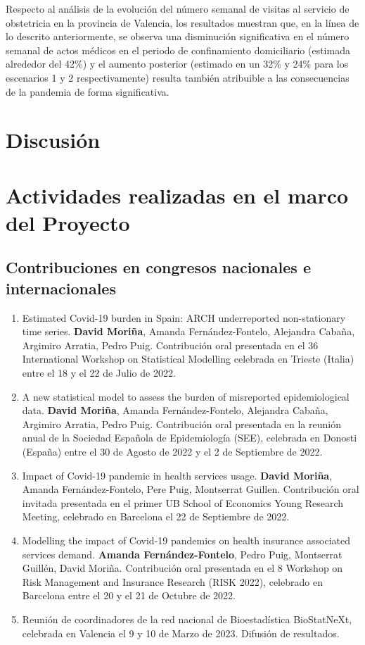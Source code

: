 \documentclass[12pt,twoside]{article} %
\begin{document}
Respecto al análisis de la evolución del número semanal de visitas al servicio de obstetricia en la provincia de Valencia, los resultados muestran que, en la línea de lo descrito anteriormente, se observa una disminución significativa en el número semanal de actos médicos en el periodo de confinamiento domiciliario (estimada alrededor del 42\%) y el aumento posterior (estimado en un 32\% y 24\% para los escenarios 1 y 2 respectivamente) resulta también atribuible a las consecuencias de la pandemia de forma significativa.  

\section{Discusión}


\section{Actividades realizadas en el marco del Proyecto}
\subsection{Contribuciones en congresos nacionales e internacionales}
\begin{enumerate}
  \item Estimated Covid-19 burden in Spain: ARCH underreported non-stationary time series. \textbf{David Moriña}, Amanda Fernández-Fontelo, Alejandra Cabaña, Argimiro Arratia, Pedro Puig. Contribución oral presentada en el 36 International Workshop on Statistical Modelling celebrada en Trieste (Italia) entre el 18 y el 22 de Julio de 2022.
  \item A new statistical model to assess the burden of misreported epidemiological data. \textbf{David Moriña}, Amanda Fernández-Fontelo, Alejandra Cabaña, Argimiro Arratia, Pedro Puig. Contribución oral presentada en la reunión anual de la Sociedad Española de Epidemiología (SEE), celebrada en Donosti (España) entre el 30 de Agosto de 2022 y el 2 de Septiembre de 2022.
  \item Impact of Covid-19 pandemic in health services usage. \textbf{David Moriña}, Amanda Fernández-Fontelo, Pere Puig, Montserrat Guillen. Contribución oral invitada presentada en el primer UB School of Economics Young Research Meeting, celebrado en Barcelona el 22 de Septiembre de 2022. 
  \item Modelling the impact of Covid-19 pandemics on health insurance associated services demand. \textbf{Amanda Fernández-Fontelo}, Pedro Puig, Montserrat Guillén, David Moriña. Contribución oral presentada en el 8 Workshop on Risk Management and Insurance Research (RISK 2022), celebrado en Barcelona entre el 20 y el 21 de Octubre de 2022.
  \item Reunión de coordinadores de la red nacional de Bioestadística BioStatNeXt, celebrada en Valencia el 9 y 10 de Marzo de 2023. Difusión de resultados.
\end{enumerate}
  
\end{document}
